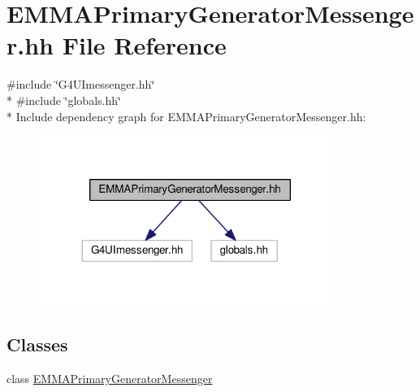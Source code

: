 \hypertarget{EMMAPrimaryGeneratorMessenger_8hh}{}\section{E\+M\+M\+A\+Primary\+Generator\+Messenger.\+hh File Reference}
\label{EMMAPrimaryGeneratorMessenger_8hh}
{\ttfamily \#include \char`\"{}G4\+U\+Imessenger.\+hh\char`\"{}}\\*
{\ttfamily \#include \char`\"{}globals.\+hh\char`\"{}}\\*
Include dependency graph for E\+M\+M\+A\+Primary\+Generator\+Messenger.\+hh\+:
\nopagebreak
\begin{figure}[H]
\begin{center}
\leavevmode
\includegraphics[width=272pt]{EMMAPrimaryGeneratorMessenger_8hh__incl}
\end{center}
\end{figure}
\subsection*{Classes}
\begin{DoxyCompactItemize}
\item 
class \hyperlink{classEMMAPrimaryGeneratorMessenger}{E\+M\+M\+A\+Primary\+Generator\+Messenger}
\end{DoxyCompactItemize}
